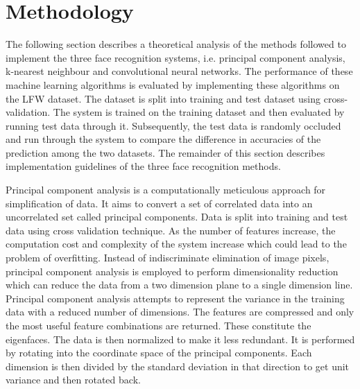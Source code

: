 \documentclass[conference]{IEEEtran}
\begin{document}
\section{Methodology}
\label{sec:3 Methodology} 
The following section describes a theoretical analysis of the methods followed to implement the three face recognition systems, i.e. principal component analysis, k-nearest neighbour and convolutional neural networks. The performance of these machine learning algorithms is evaluated by implementing these algorithms on the LFW dataset. The dataset is split into training and test dataset using cross-validation. The system is trained on the training dataset and then evaluated by running test data through it. Subsequently, the test data is randomly occluded and run through the system to compare the difference in accuracies of the prediction among the two datasets. The remainder of this section describes implementation guidelines of the three face recognition methods.


Principal component analysis is a computationally meticulous approach for simplification of data. It aims to convert a set of correlated data into an uncorrelated set called principal components\cite{turk1991face}. Data is split into training and test data using cross validation technique. As the number of features increase, the computation cost and complexity of the system increase which could lead to the problem of overfitting. Instead of indiscriminate elimination of image pixels, principal component analysis is employed to perform dimensionality reduction which can reduce the data from a two dimension plane to a single dimension line. Principal component analysis  attempts to represent the variance in the training data with a reduced number of dimensions. The features are compressed and only the most useful feature combinations are returned. These constitute the eigenfaces. The data is then normalized to make it less redundant. It is performed by rotating into the coordinate space of the principal components. Each dimension is then divided by the standard deviation in that direction to get unit variance and then rotated back. 
\end{document}
